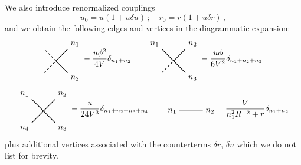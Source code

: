 \documentclass[11pt,a4paper]{article}
\begin{document}
We also introduce renormalized couplings
\begin{equation}
    u_0 = u(1 + u\delta u)\,;\quad r_0 = r(1 + u \delta r)\,,
\end{equation}
and we obtain the following edges and vertices in the diagrammatic expansion:
\begin{displaymath}
\begin{tikzpicture}[scale=0.5, baseline=(current bounding box.center)]
    \draw[densely dashed, thick] (-1, -1) -- (0, 0) -- (-1, 1);
    \draw[thick] (+1, -1) -- (0, 0) -- (+1, 1);
    \node[above right] at (1, 1) {$n_1$};
    \node[below right] at (1, -1) {$n_2$};
\end{tikzpicture}
    -\frac{u\bar{\phi}^2}{4V}\delta_{n_1 + n_2}
    \quad\quad
\begin{tikzpicture}[scale=0.5, baseline=(current bounding box.center)]
    \draw[densely dashed, thick] (-1, -1) -- (0, 0);
    \draw[thick] (0, 0) -- (-1, 1);
    \draw[thick] (+1, -1) -- (0, 0) -- (+1, 1);
    \node[above left] at (-1, 1) {$n_1$};
    \node[above right] at (1, 1) {$n_2$};
    \node[below right] at (1, -1) {$n_3$};
\end{tikzpicture}
    -\frac{u\bar{\phi}}{6V^2}\delta_{n_1 + n_2 + n_3}
\end{displaymath}
\begin{displaymath}
\begin{tikzpicture}[scale=0.5, baseline=(current bounding box.center)]
    \draw[thick] (-1, -1) -- (1, 1);
    \draw[thick] (-1, 1) -- ( 1, -1);
    \node[above left] at (-1, 1) {$n_1$};
    \node[above right] at (1, 1) {$n_2$};
    \node[below right] at (1, -1) {$n_3$};
    \node[below left] at (-1, -1) {$n_4$};
\end{tikzpicture}
    -\frac{u}{24V^3}\delta_{n_1 + n_2 + n_3 + n_4}
\quad\quad
\begin{tikzpicture}[scale=0.5, baseline=(current bounding box.center)]
    \draw[thick] (-1, 0) -- (1, 0);
    \node[left] at (-1, 0) {$n_1$};
    \node[right] at (1, 0) {$n_2$};
\end{tikzpicture}
    \quad
    \frac{V}{n_1^2R^{-2} + r}\delta_{n_1 + n_2}
\end{displaymath}
plus additional vertices associated with the counterterms $\delta r$, $\delta
u$ which we do not list for brevity.
\end{document}
